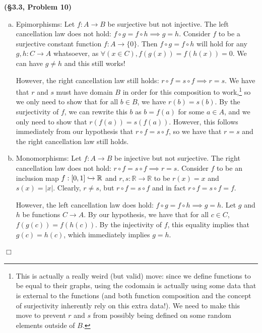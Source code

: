 \documentclass[12pt]{article}
\theoremstyle{definition}
\newenvironment{Solution}{\noindent {\sc Solution.}}{$\Box$ \vspace{2 ex}}
\begin{document}
\begin{Solution}
{\bf (\S3.3, Problem 10)}\\
\begin{enumerate}[(a)]
    \item Epimorphisms: Let $f: A \to B$ be surjective but not injective. The left cancellation law does not hold: $f \circ g = f \circ h \implies g = h$. Consider $f$ to be a surjective constant function $f : A \to \{0\}$. Then $f \circ g = f \circ h$ will hold for any $g, h : C \to A$ whatsoever, as $\forall (x \in C), f(g(x)) = f(h(x))=0$. We can have $g \ne h$ and this still works!
    
    However, the right cancellation law still holds: $r \circ f = s \circ f \implies r = s$. We have that $r$ and $s$ must have domain $B$ in order for this composition to work,\footnote{This is actually a really weird (but valid) move: since we define functions to be equal to their graphs, using the codomain is actually using some data that is external to the functions (and both function composition and the concept of surjectivity inherently rely on this extra data!). We need to make this move to prevent $r$ and $s$ from possibly being defined on some random elements outside of $B$.} so we only need to show that for all $b \in B$, we have $r(b) = s(b)$. By the surjectivity of $f$, we can rewrite this $b$ as $b = f(a)$ for some $a \in A$, and we only need to show that $r(f(a))=s(f(a))$. However, this follows immediately from our hypothesis that $r \circ f = s \circ f$, so we have that $r = s$ and the right cancellation law still holds.

    \item Monomorphisms: Let $f : A \to B$ be injective but not surjective. The right cancellation law does not hold: $r \circ f = s \circ f \implies r = s$. Consider $f$ to be an inclusion map $f : [0,1] \xhookrightarrow{} \mathbb{R}$ and $r,s : \mathbb{R} \to \mathbb{R}$ to be $r(x)=x$ and $s(x)=|x|$. Clearly, $r\ne s$, but $r \circ f = s\circ f$ and in fact $r \circ f = s \circ f = f$.

    However, the left cancellation law does hold: $f \circ g = f \circ h \implies g = h$. Let $g$ and $h$ be functions $C \to A$. By our hypothesis, we have that for all $c \in C$, $f(g(c)) = f(h(c))$. By the injectivity of $f$, this equality implies that $g(c) = h(c)$, which immediately implies $g = h$.
\end{enumerate}
\end{Solution}

\vspace{0.5cm}
\end{document}
